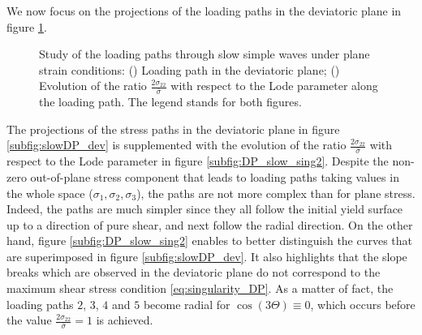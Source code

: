 We now focus on the projections of the loading paths in the deviatoric plane in figure \ref{fig:slowDP_dev}.
\begin{figure}[h!]
  \centering
   \qquad
  \caption{Study of the loading paths through slow simple waves under plane strain conditions: () Loading path in the deviatoric plane; () Evolution of the ratio $\frac{2\sigma_{22}}{\bar{\sigma}}$ with respect to the Lode parameter along the loading path. The legend stands for both figures.}
  \label{fig:slowDP_dev}
\end{figure}
The projections of the stress paths in the deviatoric plane in figure \ref{subfig:slowDP_dev} is supplemented with the evolution of the ratio $\frac{2\sigma_{22}}{\bar{\sigma}}$ with respect to the Lode parameter in figure \ref{subfig:DP_slow_sing2}.
Despite the non-zero out-of-plane stress component that leads to loading paths taking values in the whole space ($\sigma_1,\sigma_2,\sigma_3$), the paths are not more complex than for plane stress.
Indeed, the paths are much simpler since they all follow the initial yield surface up to a direction of pure shear, and next follow the radial direction.
On the other hand, figure \ref{subfig:DP_slow_sing2} enables to better distinguish the curves that are superimposed in figure \ref{subfig:slowDP_dev}.
It also highlights that the slope breaks which are observed in the deviatoric plane do not correspond to the maximum shear stress condition \eqref{eq:singularity_DP}.
As a matter of fact, the loading paths $2$, $3$, $4$ and $5$ become radial for $\cos(3\Theta) \equiv 0$, which occurs before the value $\frac{2\sigma_{22}}{\bar{\sigma}}=1$ is achieved.  

